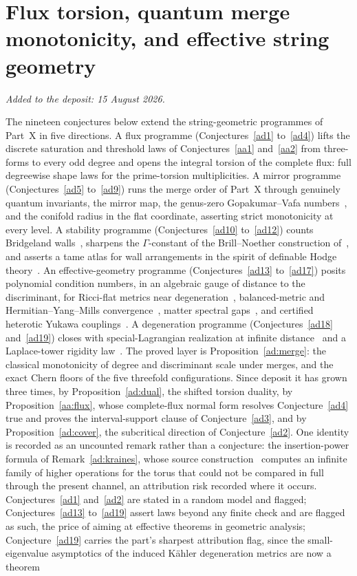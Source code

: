 \documentclass[11pt]{article}
\theoremstyle{definition}
\begin{document}
\part{Flux torsion, quantum merge monotonicity, and effective string geometry}

\medskip\noindent\emph{Added to the deposit: 15 August 2026.}\par\medskip

The nineteen conjectures below extend the string-geometric programmes of Part~X in five directions.  A flux programme (Conjectures~\ref{ad1} to~\ref{ad4}) lifts the discrete saturation and threshold laws of Conjectures~\ref{aa1} and~\ref{aa2} from three-forms to every odd degree and opens the integral torsion of the complete flux: full degreewise shape laws for the prime-torsion multiplicities.  A mirror programme (Conjectures~\ref{ad5} to~\ref{ad9}) runs the merge order of Part~X through genuinely quantum invariants, the mirror map, the genus-zero Gopakumar--Vafa numbers~\cite{HKTY95,Zin14}, and the conifold radius in the flat coordinate, asserting strict monotonicity at every level.  A stability programme (Conjectures~\ref{ad10} to~\ref{ad12}) counts Bridgeland walls~\cite{JM19,BM22}, sharpens the $\Gamma$-constant of the Brill--Noether construction of~\cite{FKLR25}, and asserts a tame atlas for wall arrangements in the spirit of definable Hodge theory~\cite{BKT20}.  An effective-geometry programme (Conjectures~\ref{ad13} to~\ref{ad17}) posits polynomial condition numbers, in an algebraic gauge of distance to the discriminant, for Ricci-flat metrics near degeneration~\cite{Li20,SZ19}, balanced-metric and Hermitian--Yang--Mills convergence~\cite{BHJMM26,CSYZ26,Chu12,ABKO10}, matter spectral gaps~\cite{Ash24,AHHO23}, and certified heterotic Yukawa couplings~\cite{But24,Con24}.  A degeneration programme (Conjectures~\ref{ad18} and~\ref{ad19}) closes with special-Lagrangian realization at infinite distance~\cite{HMWW26,MWW26} and a Laplace-tower rigidity law~\cite{AR21,AhR23}.  The proved layer is Proposition~\ref{ad:merge}: the classical monotonicity of degree and discriminant scale under merges, and the exact Chern floors of the five threefold configurations.  Since deposit it has grown three times, by Proposition~\ref{ad:dual}, the shifted torsion duality, by Proposition~\ref{aa:flux}, whose complete-flux normal form resolves Conjecture~\ref{ad4} true and proves the interval-support clause of Conjecture~\ref{ad3}, and by Proposition~\ref{ad:cover}, the subcritical direction of Conjecture~\ref{ad2}.  One identity is recorded as an uncounted remark rather than a conjecture: the insertion-power formula of Remark~\ref{ad:kraines}, whose source construction~\cite{LME24} computes an infinite family of higher operations for the torus that could not be compared in full through the present channel, an attribution risk recorded where it occurs.  Conjectures~\ref{ad1} and~\ref{ad2} are stated in a random model and flagged; Conjectures~\ref{ad13} to~\ref{ad19} assert laws beyond any finite check and are flagged as such, the price of aiming at effective theorems in geometric analysis; Conjecture~\ref{ad19} carries the part's sharpest attribution flag, since the small-eigenvalue asymptotics of the induced K\"ahler degeneration metrics are now a theorem 
\end{document}
